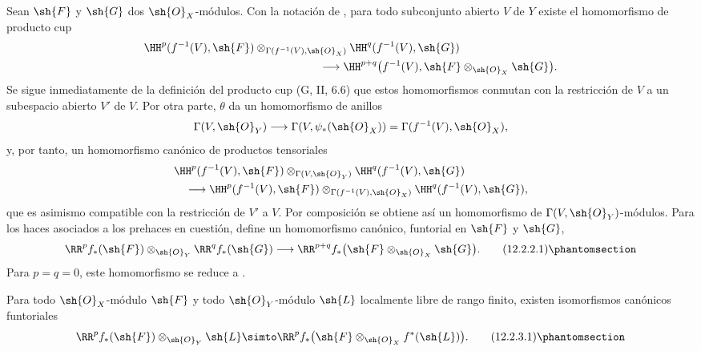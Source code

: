 \documentclass[oneside]{amsart}
\newcommand{\oldpage}[2][]{{\marginnote{\normalfont\textbf{#1}~|~#2}}\ignorespaces}
\let\EGAOriginalLabel\label
\renewcommand{\label}[1]{\phantomsection\EGAOriginalLabel{#1}}
\begin{document}
\begin{env}[12.2.2]
\label{0.12.2.2}
Sean $\sh{F}$ y $\sh{G}$ dos $\sh{O}_X$-módulos.
Con la notación de , para todo subconjunto abierto $V$ de
$Y$ existe el homomorfismo de producto cup 
\[
  \begin{aligned}
  &\HH^p(f^{-1}(V),\sh{F})
    \otimes_{\Gamma(f^{-1}(V),\sh{O}_X)}
    \HH^q(f^{-1}(V),\sh{G})\\
  &\hspace{55mm}\longrightarrow
    \HH^{p+q}\bigl(f^{-1}(V),
      \sh{F}\otimes_{\sh{O}_X}\sh{G}\bigr).
  \end{aligned}
\]
\oldpage[0\textsubscript{III}]{58}
Se sigue inmediatamente de la definición del producto cup
(G, II, 6.6) que estos homomorfismos conmutan con la restricción de
$V$ a un subespacio abierto $V'$ de $V$.
Por otra parte, $\theta$ da un homomorfismo de anillos
\[
  \Gamma(V,\sh{O}_Y)
  \longrightarrow\Gamma(V,\psi_*(\sh{O}_X))
  =\Gamma(f^{-1}(V),\sh{O}_X),
\]
y, por tanto, un homomorfismo canónico de productos tensoriales
\[
  \begin{aligned}
  &\HH^p(f^{-1}(V),\sh{F})
    \otimes_{\Gamma(V,\sh{O}_Y)}
    \HH^q(f^{-1}(V),\sh{G})\\
  &\quad\longrightarrow
    \HH^p(f^{-1}(V),\sh{F})
    \otimes_{\Gamma(f^{-1}(V),\sh{O}_X)}
    \HH^q(f^{-1}(V),\sh{G}),
  \end{aligned}
\]
que es asimismo compatible con la restricción de $V'$ a $V$.
Por composición se obtiene así un homomorfismo de
$\Gamma(V,\sh{O}_Y)$-módulos.  Para los haces asociados a los
prehaces en cuestión, define un homomorfismo canónico,
funtorial en $\sh{F}$ y $\sh{G}$,
\[
  \RR^p f_*(\sh{F})\otimes_{\sh{O}_Y}\RR^q f_*(\sh{G})
  \longrightarrow
  \RR^{p+q}f_*
    \bigl(\sh{F}\otimes_{\sh{O}_X}\sh{G}\bigr).
  \tag{12.2.2.1}
  \label{0.12.2.2.1}
\]
Para $p=q=0$, este homomorfismo se reduce a
.
\end{env}

\begin{proposition}[12.2.3]
\label{0.12.2.3}
Para todo $\sh{O}_X$-módulo $\sh{F}$ y todo $\sh{O}_Y$-módulo
$\sh{L}$ localmente libre de rango finito, existen isomorfismos canónicos
funtoriales
\[
  \RR^p f_*(\sh{F})\otimes_{\sh{O}_Y}\sh{L}
  \simto
  \RR^p f_*
    \bigl(\sh{F}\otimes_{\sh{O}_X}f^*(\sh{L})\bigr).
  \tag{12.2.3.1}
  \label{0.12.2.3.1}
\]
\end{proposition}
\end{document}
